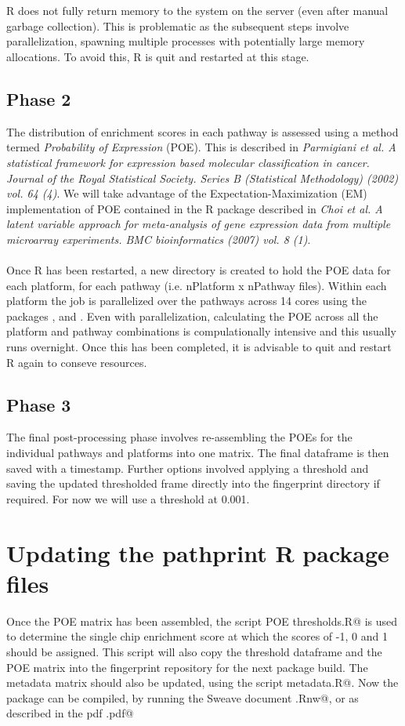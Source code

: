 \documentclass{article}
\begin{document}
\\ \\ R does not fully return memory to the system on the server (even after manual garbage collection). This is problematic as the subsequent steps involve parallelization, spawning multiple processes with potentially large memory allocations. To avoid this, R is quit and restarted at this stage.
\subsection{Phase 2}
The distribution of enrichment scores in each pathway is assessed using a method termed \emph{Probability of Expression} (POE). This is described in \emph{Parmigiani et al. A statistical framework for expression based molecular classification in cancer. Journal of the Royal Statistical Society. Series B (Statistical Methodology) (2002) vol. 64 (4)}. We will take advantage of the Expectation-Maximization (EM) implementation of POE contained in the R package \verb@metaArray@ described in \emph{Choi et al. A latent variable approach for meta-analysis of gene expression data from multiple microarray experiments. BMC bioinformatics (2007) vol. 8 (1)}.
\\ \\ Once R has been restarted, a new directory is created to hold the POE data for each platform, for each pathway (i.e. nPlatform x nPathway files). Within each platform the job is parallelized over the pathways across 14 cores using the packages \verb@foreach@, \verb@multicore@ and \verb@doMC@. Even with parallelization, calculating the POE across all the platform and pathway combinations is compulationally intensive and this usually runs overnight. Once this has been completed, it is advisable to quit and restart R again to conseve resources.
\subsection{Phase 3}
The final post-processing phase involves re-assembling the POEs for the individual pathways and platforms into one matrix. The final dataframe is then saved with a timestamp. Further options involved applying a threshold and saving the updated thresholded frame directly into the fingerprint directory if required. For now we will use a threshold at 0.001. 
\section{Updating the pathprint R package files}
Once the POE matrix has been assembled, the script \verb@constructing POE thresholds.R@ is used to determine the single chip enrichment score at which the scores of -1, 0 and 1 should be assigned. This script will also copy the threshold dataframe and the POE matrix into the fingerprint repository for the next package build. The metadata matrix should also be updated, using the script \verb@Matrix metadata.R@. Now the package can be compiled, by running the Sweave document \verb@compilingPackage.Rnw@, or as described in the pdf \verb@compilingPackage.pdf@
\end{document}
